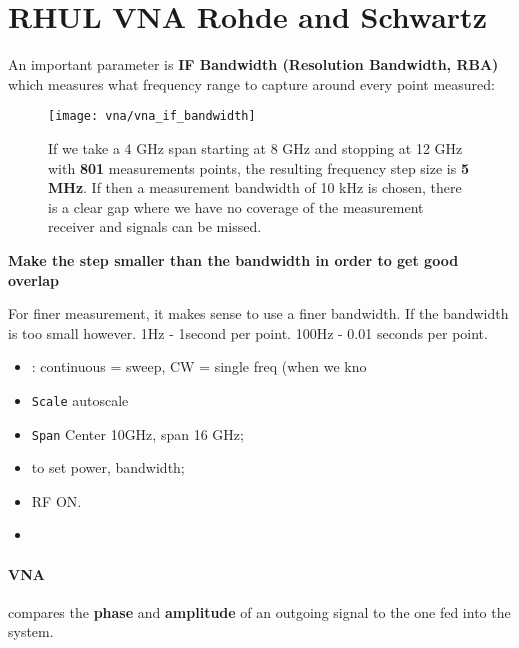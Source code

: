 
\section{RHUL VNA Rohde and Schwartz}
An  important parameter  is  \textbf{IF Bandwidth  (Resolution Bandwidth,  RBA)}
which measures what frequency range to capture around every point measured:

\begin{figure}[h]
  \centering \texttt{[image: vna/vna\_if\_bandwidth]}
  \caption{\small If we take  a 4 GHz span starting at 8 GHz  and stopping at 12
    GHz with \textbf{801} measurements points, the resulting frequency step size
    is \textbf{5  MHz}.  If then  a measurement bandwidth  of 10 kHz  is chosen,
    there is a clear  gap where we have no coverage  of the measurement receiver
    and signals can be missed.\label{fig:vna/vna_if_bandwidth}}
\end{figure}

\begin{framed}\noindent
  \textbf{Make the step smaller than the bandwidth in order to get good overlap}

  For  finer measurement,  it  makes sense  to  use a  finer  bandwidth. If  the
  bandwidth is too small however.  1Hz - 1second per point. 100Hz - 0.01 seconds
  per point.
\end{framed}


\begin{itemize}
\item {} \ira {}: continuous = sweep, CW = single freq
  (when we kno
\item \texttt{Scale} \ira autoscale
\item \texttt{Span} \ira Center 10GHz, span 16 GHz;
\item {} to set power, bandwidth;
\item RF ON.
\item {}
\end{itemize}

\paragraph{VNA}  compares  the  \textbf{phase}   and  \textbf{amplitude}  of  an
outgoing signal to the one fed into the system.

